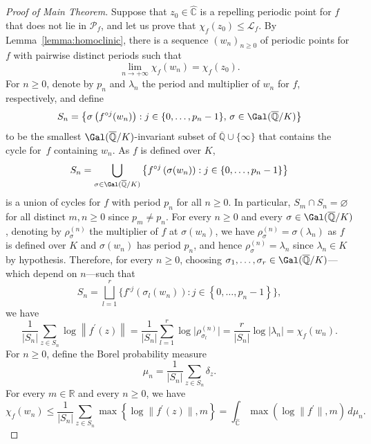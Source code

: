 \begin{proof}[Proof of Main Theorem]
Suppose that $z_{0} \in \widehat{\mathbb{C}}$ is a repelling periodic point for $f$ that does not lie in $\mathcal{P}_{f}$, and let us prove that $\chi_{f}(z_{0}) \leq \mathcal{L}_{f}$. By Lemma~\ref{lemma:homoclinic}, there is a sequence $(w_{n})_{n \geq 0}$ of periodic points for $f$ with pairwise distinct periods such that
\[
\lim_{n \to +\infty} \chi_{f}(w_{n}) = \chi_{f}(z_{0}).
\]
For $n \geq 0$, denote by $p_{n}$ and $\lambda_{n}$ the period and multiplier of $w_{n}$ for $f$, respectively, and define
\[
S_{n} = \bigl\lbrace \sigma\left(f^{\circ j}(w_{n}) \right) : j \in\lbrace 0, \dotsc, p_{n} -1\rbrace, \, \sigma \in \Gal(\overline{\mathbb{Q}}/K) \bigr\rbrace
\]
to be the smallest $\Gal(\overline{\mathbb{Q}}/K)$\nobreakdash-invariant subset of $\overline{\mathbb{Q}} \cup \lbrace \infty \rbrace$ that contains the cycle for~$f$ containing $w_{n}$. As $f$ is defined over $K$,
\[
S_{n} = \bigcup_{\sigma \in \Gal(\overline{\mathbb{Q}}/K)} \left\lbrace f^{\circ j}\left(\sigma(w_{n}) \right) : j \in\lbrace 0, \dotsc, p_{n} -1\rbrace \right\rbrace
\]
is a union of cycles for $f$ with period $p_{n}$ for all $n \geq 0$. In particular, $S_{m} \cap S_{n} = \varnothing$ for all distinct $m, n \geq 0$ since $p_{m} \neq p_{n}$. For every $n \geq 0$ and every $\sigma \in \Gal(\overline{\mathbb{Q}}/K)$, denoting by $\rho_{\sigma}^{(n)}$ the multiplier of $f$ at $\sigma(w_{n})$, we have $\rho_{\sigma}^{(n)} = \sigma\left(\lambda_{n} \right)$ as $f$ is defined over $K$ and $\sigma(w_{n})$ has period $p_{n}$, and hence $\rho_{\sigma}^{(n)} = \lambda_{n}$ since $\lambda_{n} \in K$ by hypothesis. Therefore, for every $n \geq 0$, choosing $\sigma_{1}, \dotsc, \sigma_{r} \in \Gal(\overline{\mathbb{Q}}/K)$---which depend on $n$---such that
\[
S_{n} = \bigsqcup_{l = 1}^{r} \bigl\lbrace f^{\circ j}\left(\sigma_{l}(w_{n}) \right) : j \in \left\lbrace 0, \dotsc, p_{n} -1 \right\rbrace \bigr\rbrace,
\]
we have
\[
\frac{1}{\left\lvert S_{n} \right\rvert} \sum_{z \in S_{n}} \log\left\lVert f^{\prime}(z) \right\rVert = \frac{1}{\left\lvert S_{n} \right\rvert} \sum_{l = 1}^{r} \log\vert \rho_{\sigma_{l}}^{(n)}\vert = \frac{r}{\left\lvert S_{n} \right\rvert} \log\left\lvert \lambda_{n} \right\rvert = \chi_{f}(w_{n}).
\]
For $n \geq 0$, define the Borel probability measure
\[
\mu_{n} = \frac{1}{\left\lvert S_{n} \right\rvert} \sum_{z \in S_{n}} \delta_{z}.
\]
For every $m \in \mathbb{R}$ and every $n \geq 0$, we have
\[
\chi_{f}(w_{n}) \leq \frac{1}{\left\lvert S_{n} \right\rvert} \sum_{z \in S_{n}} \max\left\lbrace \log\lVert f^{\prime}(z)\rVert, m \right\rbrace = \int_{\widehat{\mathbb{C}}} \max\left(\log\lVert f^{\prime}\rVert, m \right) \, d\mu_{n}.
\]
\end{proof}
